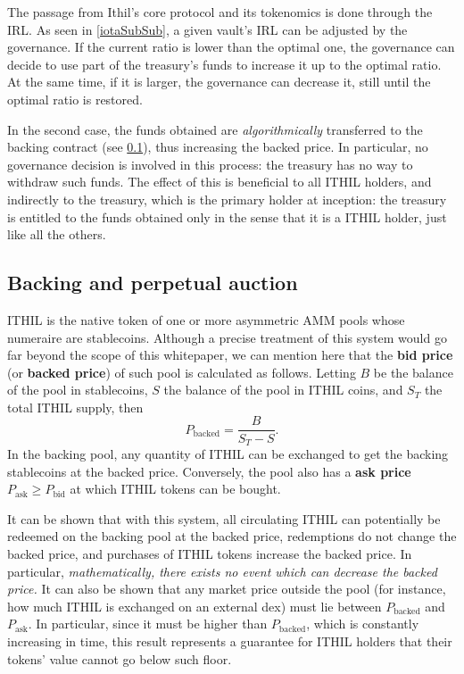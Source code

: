 \documentclass[a4paper,10 pt]{article}
\theoremstyle{definition}
\begin{document}
The passage from Ithil's core protocol and its tokenomics is done through the IRL. As seen in \ref{iotaSubSub}, a given vault's IRL can be adjusted by the governance. If the current ratio is lower than the optimal one, the governance can decide to use part of the treasury's funds to increase it up to the optimal ratio. At the same time, if it is larger, the governance can decrease it, still until the optimal ratio is restored.

In the second case, the funds obtained are {\it algorithmically} transferred to the backing contract (see \ref{bpaSub}), thus increasing the backed price. In particular, no governance decision is involved in this process: the treasury has no way to withdraw such funds. The effect of this is beneficial to all ITHIL holders, and indirectly to the treasury, which is the primary holder at inception: the treasury is entitled to the funds obtained only in the sense that it is a ITHIL holder, just like all the others.

\subsection{Backing and perpetual auction}\label{bpaSub}

ITHIL is the native token of one or more asymmetric AMM pools whose numeraire are stablecoins. Although a precise treatment of this system would go far beyond the scope of this whitepaper, we can mention here that the {\bf bid price} (or {\bf backed price}) of such pool is calculated as follows. Letting $B$ be the balance of the pool in stablecoins, $S$ the balance of the pool in ITHIL coins, and $S_T$ the total ITHIL supply, then
\begin{equation}\label{backedprice}
P_\text{backed} = \frac{B}{S_T-S}.
\end{equation}
In the backing pool, any quantity of ITHIL can be exchanged to get the backing stablecoins at the backed price. Conversely, the pool also has a {\bf ask price} $P_{\text{ask}} \ge P_{\text{bid}}$ at which ITHIL tokens can be bought.

It can be shown that with this system, all circulating ITHIL can potentially be redeemed on the backing pool at the backed price, redemptions do not change the backed price, and purchases of ITHIL tokens increase the backed price. In particular, {\it mathematically, there exists no event which can decrease the backed price.} It can also be shown that any market price outside the pool (for instance, how much ITHIL is exchanged on an external dex) must lie between $P_\text{backed}$ and $P_\text{ask}$. In particular, since it must be higher than $P_{\text{backed}}$, which is constantly increasing in time, this result represents a guarantee for ITHIL holders that their tokens' value cannot go below such floor.
\end{document}
